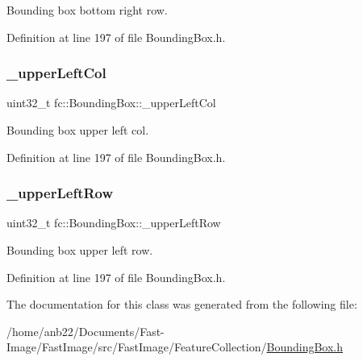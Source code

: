 Bounding box bottom right row. 



Definition at line 197 of file Bounding\+Box.\+h.

\mbox{\label{classfc_1_1BoundingBox_a5e384b0edc1e5ae8c264c74f317725ea}} 
\subsubsection{\texorpdfstring{\+\_\+upper\+Left\+Col}{\_upperLeftCol}}
{\footnotesize\ttfamily uint32\+\_\+t fc\+::\+Bounding\+Box\+::\+\_\+upper\+Left\+Col\hspace{0.3cm}{\ttfamily [private]}}



Bounding box upper left col. 



Definition at line 197 of file Bounding\+Box.\+h.

\mbox{\label{classfc_1_1BoundingBox_a9e75c4e7a1249bfd286d3c2cdb8bce84}} 
\subsubsection{\texorpdfstring{\+\_\+upper\+Left\+Row}{\_upperLeftRow}}
{\footnotesize\ttfamily uint32\+\_\+t fc\+::\+Bounding\+Box\+::\+\_\+upper\+Left\+Row\hspace{0.3cm}{\ttfamily [private]}}



Bounding box upper left row. 



Definition at line 197 of file Bounding\+Box.\+h.



The documentation for this class was generated from the following file\+:\begin{DoxyCompactItemize}
\item 
/home/anb22/\+Documents/\+Fast-\/\+Image/\+Fast\+Image/src/\+Fast\+Image/\+Feature\+Collection/\hyperlink{BoundingBox_8h}{Bounding\+Box.\+h}\end{DoxyCompactItemize}
